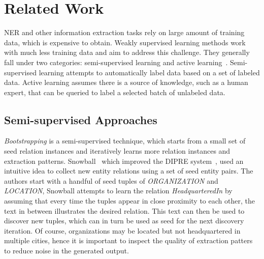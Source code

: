 \section{Related Work}
\label{sect:relatedwork}
NER and other information extraction tasks rely on large amount of training data, which is expensive to obtain.
Weakly supervised learning methods work with much less training data and aim to address this challenge.
They generally fall under two categories: semi-supervised learning and active learning~\cite{zhou2017brief}.
Semi-supervised learning attempts to automatically label data based on a set of labeled data. 
Active learning assumes there is a source of knowledge, such as a human expert, that can be queried 
to label a selected batch of unlabeled data. 

\subsection{Semi-supervised Approaches}
\textit{Bootstrapping} is a semi-supervised technique, which starts from a small set of seed relation instances and iteratively learns more relation instances and extraction patterns.
Snowball~\cite{agichtein2000snowball} which improved the DIPRE  system~\cite{brin1998extracting}, used an intuitive idea to collect new entity relations using a set of seed entity pairs.
The authors start with a handful of seed tuples of \textit{ORGANIZATION} and \textit{LOCATION}, Snowball attempts to learn the relation \textit{HeadquarteredIn} by assuming that every time the tuples appear in close proximity to each other, the text in between illustrates the desired relation.
This text can then be used to discover new tuples, which can in turn be used as seed for the next discovery iteration.
Of course, organizations may be located but not headquartered in multiple cities, hence it is important to inspect the quality of extraction patters to reduce noise in the generated output.

